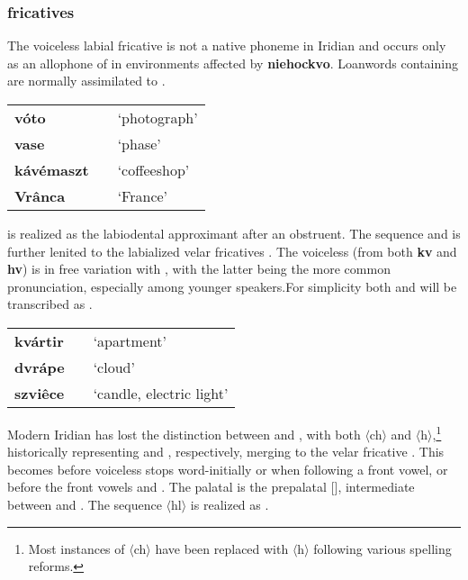 \subsubsection{fricatives}
The voiceless labial fricative  is not a native phoneme in Iridian and occurs only as an allophone of  in environments affected by \textbf{niehockvo}. Loanwords containing  are normally assimilated to .

\begin{center}\small
	\begin{tabularx}{0.8\textwidth}{>{\bfseries}YYY}
		vóto		& 		&`photograph'\\
 		vase		& 			&`phase'\\
 		kávémaszt	& 	&`coffeeshop'\\
 		Vrânca		&  & `France'\\
	\end{tabularx}
\end{center}

\par {} is realized as the labiodental approximant  after an obstruent. The sequence  and  is further lenited to the labialized velar fricatives . The voiceless  (from both \textbf{kv} and \textbf{hv}) is in free variation with , with the latter being the more common pronunciation, especially among younger speakers.For simplicity both  and  will be transcribed as .

\begin{center} \small
	\begin{tabularx}{0.8\textwidth}{>{\bfseries}YYY}
		kvártir		&  			& `apartment'\\
		dvrápe		& 				&`cloud'\\
		szviêce		& 	& `candle, electric light'\\
	\end{tabularx}
\end{center}

\par Modern Iridian has lost the distinction between  and , with both $\langle$ch$\rangle$ and $\langle$h$\rangle$,\footnote{Most instances of $\langle$ch$\rangle$ have been replaced with $\langle$h$\rangle$ following various spelling reforms.} historically representing  and , respectively, merging to the velar fricative . This becomes  before voiceless stops word-initially or when following a front vowel, or before the front vowels  and . The palatal  is the prepalatal [], intermediate between  and . The sequence $\langle$hl$\rangle$ is realized as \bt{\textbeltl}.

